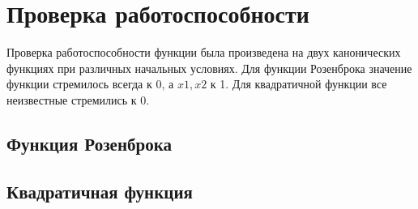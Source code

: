     \section{Проверка работоспособности}
        Проверка работоспособности функции была произведена на двух канонических функциях при различных начальных условиях. Для функции Розенброка значение функции стремилось всегда к $0$, а $x1, x2$ к 1. Для квадратичной функции все неизвестные стремились к $0$.

        \subsection{Функция Розенброка}



        \subsection{Квадратичная функция}



